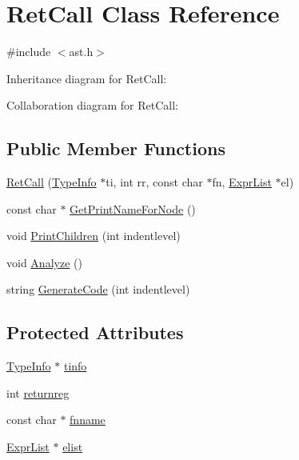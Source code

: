 \hypertarget{class_ret_call}{}\section{Ret\+Call Class Reference}
\label{class_ret_call}


{\ttfamily \#include $<$ast.\+h$>$}



Inheritance diagram for Ret\+Call\+:


Collaboration diagram for Ret\+Call\+:
\subsection*{Public Member Functions}
\begin{DoxyCompactItemize}
\item 
\hyperlink{class_ret_call_a36752f2de27b76212b4ae0066ddcd578}{Ret\+Call} (\hyperlink{class_type_info}{Type\+Info} $\ast$ti, int rr, const char $\ast$fn, \hyperlink{class_expr_list}{Expr\+List} $\ast$el)
\item 
const char $\ast$ \hyperlink{class_ret_call_afb92899368ccb84bad8d95c1a8a57e93}{Get\+Print\+Name\+For\+Node} ()
\item 
void \hyperlink{class_ret_call_a93de1dff14cd07dd58441a320df7f798}{Print\+Children} (int indentlevel)
\item 
void \hyperlink{class_ret_call_ae97ba198b2aff2badbee17b2f02d989a}{Analyze} ()
\item 
string \hyperlink{class_ret_call_a4bb2cb50dc6e81aaf3a312c228cb5f4e}{Generate\+Code} (int indentlevel)
\end{DoxyCompactItemize}
\subsection*{Protected Attributes}
\begin{DoxyCompactItemize}
\item 
\hyperlink{class_type_info}{Type\+Info} $\ast$ \hyperlink{class_ret_call_a5dd7e7af3540ea68eae6e3c4c572e426}{tinfo}
\item 
int \hyperlink{class_ret_call_a3fc6d5d729c3d0e52b4e8020719c9d08}{returnreg}
\item 
const char $\ast$ \hyperlink{class_ret_call_ade43d299c39866859178279cfe6a85bd}{fnname}
\item 
\hyperlink{class_expr_list}{Expr\+List} $\ast$ \hyperlink{class_ret_call_a2be9b1449ca100c24744097616f15db8}{elist}
\end{DoxyCompactItemize}


